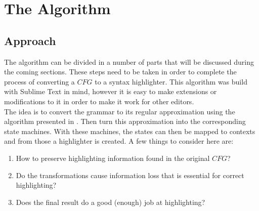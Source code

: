 
\chapter{The Algorithm} %

\label{chap:Algorithm} %


\section{Approach}
The algorithm can be divided in a number of parts that will be discussed during the coming sections. These steps need to be taken in order to complete the process of converting a $CFG$ to a syntax highlighter. This algorithm was build with Sublime Text in mind, however it is easy to make extensions or modifications to it in order to make it work for other editors.\\
The idea is to convert the grammar to its regular approximation using the algorithm presented in \cite{MohriNederhof}. Then turn this approximation into the corresponding state machines. With these machines, the states can then be mapped to contexts and from those a highlighter is created. A few things to consider here are:
\begin{enumerate}
\item How to preserve highlighting information found in the original $CFG$?
\item Do the transformations cause information loss that is essential for correct highlighting?
\item Does the final result do a good (enough) job at highlighting?
\end{enumerate}

